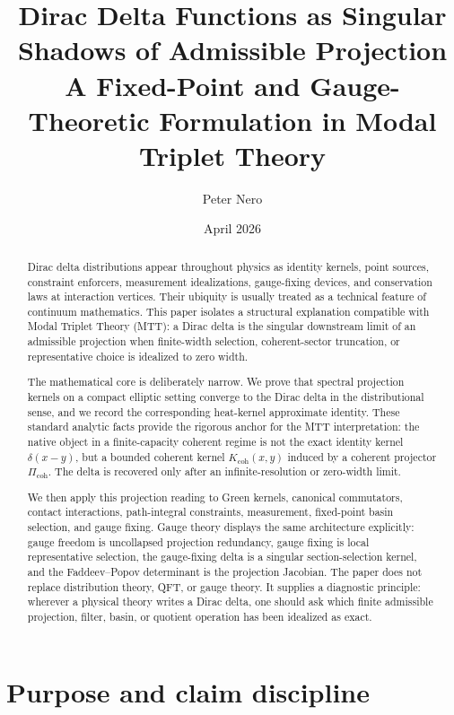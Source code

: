 \documentclass[11pt]{article}
\title{\Large Dirac Delta Functions as Singular Shadows of Admissible Projection\\
\large A Fixed-Point and Gauge-Theoretic Formulation in Modal Triplet Theory}
\author{Peter Nero}
\date{April 2026}
\begin{document}
\maketitle
\seriestagline

\begin{abstract}
Dirac delta distributions appear throughout physics as identity kernels, point sources,
constraint enforcers, measurement idealizations, gauge-fixing devices, and conservation
laws at interaction vertices. Their ubiquity is usually treated as a technical feature of
continuum mathematics. This paper isolates a structural explanation compatible with
Modal Triplet Theory (MTT): a Dirac delta is the singular downstream limit of an
admissible projection when finite-width selection, coherent-sector truncation, or
representative choice is idealized to zero width.

The mathematical core is deliberately narrow. We prove that spectral projection kernels
on a compact elliptic setting converge to the Dirac delta in the distributional sense, and
we record the corresponding heat-kernel approximate identity. These standard analytic
facts provide the rigorous anchor for the MTT interpretation: the native object in a
finite-capacity coherent regime is not the exact identity kernel \(\delta(x-y)\), but a
bounded coherent kernel \(K_{\mathrm{coh}}(x,y)\) induced by a coherent projector
\(\Pi_{\mathrm{coh}}\). The delta is recovered only after an infinite-resolution or
zero-width limit.

We then apply this projection reading to Green kernels, canonical commutators, contact
interactions, path-integral constraints, measurement, fixed-point basin selection, and
gauge fixing. Gauge theory displays the same architecture explicitly: gauge freedom is
uncollapsed projection redundancy, gauge fixing is local representative selection, the
gauge-fixing delta is a singular section-selection kernel, and the Faddeev--Popov
determinant is the projection Jacobian. The paper does not replace distribution theory,
QFT, or gauge theory. It supplies a diagnostic principle: wherever a physical theory writes
a Dirac delta, one should ask which finite admissible projection, filter, basin, or quotient
operation has been idealized as exact.
\end{abstract}

\tableofcontents

\section{Purpose and claim discipline}
\end{document}
